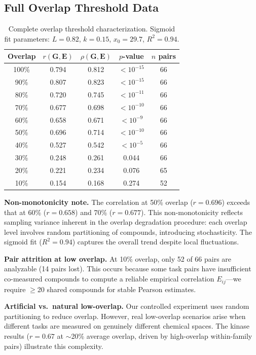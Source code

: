 \documentclass{article}
\newcommand{\G}{\mathbf{G}}
\newcommand{\E}{\mathbf{E}}
\begin{document}
\subsection{Full Overlap Threshold Data}
\begin{table}[!ht]
\caption{Complete overlap threshold characterization. Sigmoid fit parameters: $L = 0.82$, $k = 0.15$, $x_0 = 29.7$, $R^2 = 0.94$.}
\begin{center}
\begin{tabular*}{\textwidth}{@{\extracolsep{\fill}}ccccc@{}}
\toprule
Overlap & $r(\G, \E)$ & $\rho(\G, \E)$ & $p$-value & $n$ pairs \\
\midrule
100\% & 0.794 & 0.812 & $<10^{-15}$ & 66 \\
90\% & 0.807 & 0.823 & $<10^{-15}$ & 66 \\
80\% & 0.720 & 0.745 & $<10^{-11}$ & 66 \\
70\% & 0.677 & 0.698 & $<10^{-10}$ & 66 \\
60\% & 0.658 & 0.671 & $<10^{-9}$ & 66 \\
50\% & 0.696 & 0.714 & $<10^{-10}$ & 66 \\
40\% & 0.527 & 0.542 & $<10^{-5}$ & 66 \\
30\% & 0.248 & 0.261 & 0.044 & 66 \\
20\% & 0.221 & 0.234 & 0.076 & 65 \\
10\% & 0.154 & 0.168 & 0.274 & 52 \\
\bottomrule
\end{tabular*}
\end{center}
\end{table}

\textbf{Non-monotonicity note.} The correlation at 50\% overlap ($r = 0.696$) exceeds that at 60\% ($r = 0.658$) and 70\% ($r = 0.677$). This non-monotonicity reflects sampling variance inherent in the overlap degradation procedure: each overlap level involves random partitioning of compounds, introducing stochasticity. The sigmoid fit ($R^2 = 0.94$) captures the overall trend despite local fluctuations.

\textbf{Pair attrition at low overlap.} At 10\% overlap, only 52 of 66 pairs are analyzable (14 pairs lost). This occurs because some task pairs have insufficient co-measured compounds to compute a reliable empirical correlation $E_{ij}$---we require $\geq$20 shared compounds for stable Pearson estimates.

\textbf{Artificial vs.\ natural low-overlap.} Our controlled experiment uses random partitioning to reduce overlap. However, real low-overlap scenarios arise when different tasks are measured on genuinely different chemical spaces. The kinase results ($r=0.67$ at $\sim$20\% average overlap, driven by high-overlap within-family pairs) illustrate this complexity.
\end{document}
